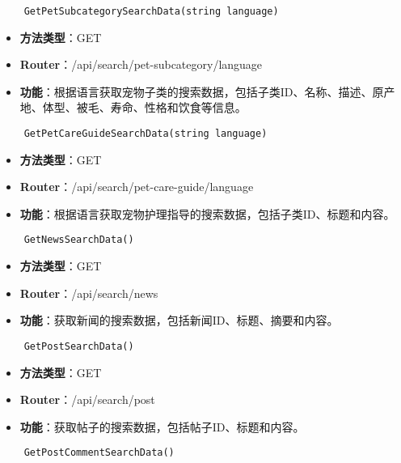 \begin{verbatim}
	GetPetSubcategorySearchData(string language)
\end{verbatim}

\begin{itemize}
	\item \textbf{方法类型}：GET
	\item \textbf{Router}：/api/search/pet-subcategory/{language}
	\item \textbf{功能}：根据语言获取宠物子类的搜索数据，包括子类ID、名称、描述、原产地、体型、被毛、寿命、性格和饮食等信息。
\end{itemize}

\begin{verbatim}
	GetPetCareGuideSearchData(string language)
\end{verbatim}

\begin{itemize}
	\item \textbf{方法类型}：GET
	\item \textbf{Router}：/api/search/pet-care-guide/{language}
	\item \textbf{功能}：根据语言获取宠物护理指导的搜索数据，包括子类ID、标题和内容。
\end{itemize}

\begin{verbatim}
	GetNewsSearchData()
\end{verbatim}

\begin{itemize}
	\item \textbf{方法类型}：GET
	\item \textbf{Router}：/api/search/news
	\item \textbf{功能}：获取新闻的搜索数据，包括新闻ID、标题、摘要和内容。
\end{itemize}

\begin{verbatim}
	GetPostSearchData()
\end{verbatim}

\begin{itemize}
	\item \textbf{方法类型}：GET
	\item \textbf{Router}：/api/search/post
	\item \textbf{功能}：获取帖子的搜索数据，包括帖子ID、标题和内容。
\end{itemize}

\begin{verbatim}
	GetPostCommentSearchData()
\end{verbatim}


